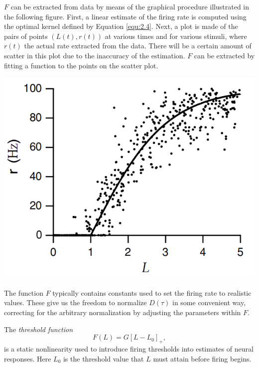 \begin{exm}
  $F$ can be extracted from data by means of the graphical procedure illustrated in the following figure. First, a linear estimate of the firing rate is computed using the optimal kernel defined by Equation \ref{equ:2.4}. Next, a plot is made of the pairs of points $(L(t),r(t))$ at various times and for various stimuli, where $r(t)$ the actual rate extracted from the data. There will be a certain amount of scatter in this plot due to the inaccuracy of the estimation. $F$ can be extracted by fitting a function to the points on the scatter plot.
  \begin{center}
    \includegraphics[scale=0.3]{./png/staticNonlinearity}
  \end{center}
\end{exm}

\begin{rem}
  The function $F$ typically contains constants used to set the firing rate to realistic values. These give us the freedom to normalize $D(\tau)$ in some convenient way, correcting for the arbitrary normalization by adjusting the parameters within $F$.
\end{rem}

\begin{exm}
  \label{thresholdFunction}
  The \emph{threshold function}
  \begin{equation}
    \label{equ:2.9}
    F(L) = G[L-L_0]_+,
  \end{equation}
  is a static nonlinearity used to introduce firing thresholds into estimates of neural responses. Here $L_0$ is the threshold value that $L$ must attain before firing begins.
\end{exm}


